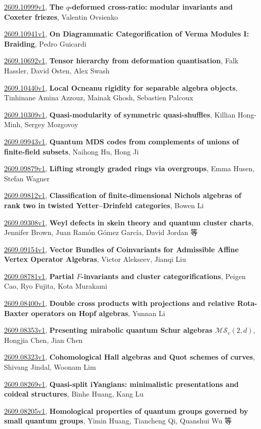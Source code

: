 \documentclass[9pt, a4paper]{article}
\theoremstyle{plain}
\theoremstyle{definition}
\theoremstyle{remark}
\newcommand{\arxiv}[3]{\href{https://arxiv.org/abs/#1}{#1}, \textbf{\textcolor{arxivblue}{#2}}, #3}
\begin{document}
\arxiv{2609.10999v1}{The $q$-deformed cross-ratio: modular invariants and Coxeter friezes}{Valentin Ovsienko}

\arxiv{2609.10941v1}{On Diagrammatic Categorification of Verma Modules I: Braiding}{Pedro Guicardi}

\arxiv{2609.10692v1}{Tensor hierarchy from deformation quantisation}{Falk Hassler, David Osten, Alex Swash}

\arxiv{2609.10440v1}{Local Ocneanu rigidity for separable algebra objects}{Tinhinane Amina Azzouz, Mainak Ghosh, Sebastien Palcoux}

\arxiv{2609.10309v1}{Quasi-modularity of symmetric quasi-shuffles}{Killian Hong-Minh, Sergey Mozgovoy}

\arxiv{2609.09943v1}{Quantum MDS codes from complements of unions of finite-field subsets}{Naihong Hu, Hong Ji}

\arxiv{2609.09879v1}{Lifting strongly graded rings via overgroups}{Emma Husen, Stefan Wagner}

\arxiv{2609.09812v1}{Classification of finite-dimensional Nichols algebras of rank two in twisted Yetter--Drinfeld categories}{Bowen Li}

\arxiv{2609.09308v1}{Weyl defects in skein theory and quantum cluster charts}{Jennifer Brown, Juan Ramón Gómez García, David Jordan 等}

\arxiv{2609.09154v1}{Vector Bundles of Coinvariants for Admissible Affine Vertex Operator Algebras}{Victor Alekseev, Jianqi Liu}

\arxiv{2609.08781v1}{Partial $F$-invariants and cluster categorifications}{Peigen Cao, Ryo Fujita, Kota Murakami}

\arxiv{2609.08400v1}{Double cross products with projections and relative Rota-Baxter operators on Hopf algebras}{Yunnan Li}

\arxiv{2609.08353v1}{Presenting mirabolic quantum Schur algebras $\mathcal{MS}_v(2,d)$}{Hongjia Chen, Jian Chen}

\arxiv{2609.08323v1}{Cohomological Hall algebras and Quot schemes of curves}{Shivang Jindal, Woonam Lim}

\arxiv{2609.08269v1}{Quasi-split iYangians: minimalistic presentations and coideal structures}{Binhe Huang, Kang Lu}

\arxiv{2609.08205v1}{Homological properties of quantum groups governed by small quantum groups}{Yimin Huang, Tiancheng Qi, Quanshui Wu 等}

\end{document}
